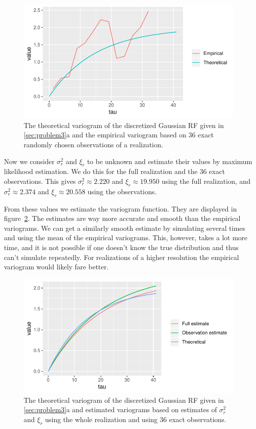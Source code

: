 \begin{figure}
    \centering
    \includegraphics[scale=0.95]{figures/3c_variogram_obs.pdf}
    \caption{The theoretical variogram of the discretized Gaussian RF given in \ref{sec:problem3}a and the empirical variogram based on 36 exact randomly chosen observations of a realization.}
    \label{fig:3c_variogram_obs}
\end{figure}

Now we consider $\sigma_r^2$ and $\xi_r$ to be unknown and estimate their values by maximum likelihood estimation. We do this for the full realization and the 36 exact observations. This gives $\sigma_r^2 \approx 2.220$ and $\xi_r \approx 19.950$ using the full realization, and $\sigma_r^2 \approx 2.374$ and $\xi_r \approx 20.558$ using the observations. 

From these values we estimate the variogram function. They are displayed in figure~\ref{fig:3c_variogram_estimates}. The estimates are way more accurate and smooth than the empirical variograms. We can get a similarly smooth estimate by simulating several times and using the mean of the empirical variograms. This, however, takes a lot more time, and it is not possible if one doesn't know the true distribution and thus can't simulate repeatedly. For realizations of a higher resolution the empirical variogram would likely fare better.

\begin{figure}
    \centering
    \includegraphics[scale=0.95]{figures/3c_variogram_estimates.pdf}
    \caption{The theoretical variogram of the discretized Gaussian RF given in \ref{sec:problem3}a and estimated variograms based on estimates of $\sigma_r^2$ and $\xi_r$ using the whole realization and using 36 exact observations.}
    \label{fig:3c_variogram_estimates}
\end{figure}

